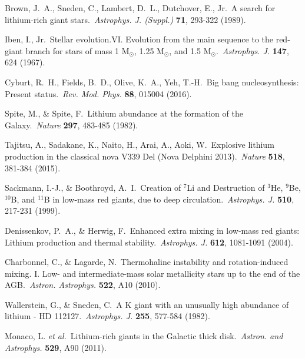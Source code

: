 \documentclass[twoside,onecolumnm,12pt]{article}
\begin{document}
\footnotesize
\begin{thebibliography}{99}


 Brown, J.~A., Sneden, C., Lambert, D.~L., Dutchover, E., Jr.\ A search for lithium-rich giant stars.\ \emph{Astrophys. J. (Suppl.)} \textbf{71}, 293-322 (1989). %

 Iben, I., Jr.\ Stellar evolution.VI. Evolution from the main sequence to the red-giant branch for stars of mass 1 M$_{\odot}$, 1.25 M$_{\odot}$, and 1.5 M$_{\odot}$.\ \emph{Astrophys. J.} \textbf{147}, 624 (1967). %

 Cyburt, R.~H., Fields, B.~D., Olive, K.~A., Yeh, T.-H.\ Big bang nucleosynthesis: Present status.\ \emph{Rev. Mod. Phys.} \textbf{88}, 015004 (2016). %

 Spite, M., \& Spite, F.\ Lithium abundance at the formation of the Galaxy.\ \emph{Nature} \textbf{297}, 483-485 (1982). %

 Tajitsu, A., Sadakane, K., Naito, H., Arai, A., Aoki, W.\ Explosive lithium production in the classical nova V339 Del (Nova Delphini 2013).\ \emph{Nature} \textbf{518}, 381-384 (2015). %

 Sackmann, I.-J., \& Boothroyd, A.~I.\ Creation of $^{7}$Li and Destruction of $^{3}$He, $^{9}$Be, $^{10}$B, and $^{11}$B in low-mass red giants, due to deep circulation.\ \emph{Astrophys. J.} \textbf{510}, 217-231 (1999). %

 Denissenkov, P.~A., \& Herwig, F.\ Enhanced extra mixing in low-mass red giants: Lithium production and thermal stability.\ \emph{Astrophys. J.} \textbf{612}, 1081-1091 (2004). %

 Charbonnel, C., \& Lagarde, N.\ Thermohaline instability and rotation-induced mixing. I. Low- and intermediate-mass solar metallicity stars up to the end of the AGB.\ \emph{Astron. Astrophys.} \textbf{522}, A10 (2010). %

 Wallerstein, G., \& Sneden, C.\ A K giant with an unusually high abundance of lithium - HD 112127.\ \emph{Astrophys. J.} \textbf{255}, 577-584 (1982). %

 Monaco, L. \emph{et al.}\ Lithium-rich giants in the Galactic thick disk.\ \emph{Astron. and Astrophys.} \textbf{529}, A90 (2011). %


\end{thebibliography}
\end{document}
